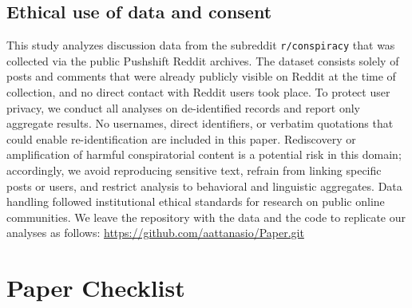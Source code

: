 \documentclass[letterpaper]{article} %
\begin{document}
\subsection{Ethical use of data and consent}
This study analyzes discussion data from the subreddit \texttt{r/conspiracy} that was collected via the public Pushshift Reddit archives. 
The dataset consists solely of posts and comments that were already publicly visible on Reddit at the time of collection, and no direct contact with Reddit users took place. 
To protect user privacy, we conduct all analyses on de-identified records and report only aggregate results.
No usernames, direct identifiers, or verbatim quotations that could enable re-identification are included in this paper. 
Rediscovery or amplification of harmful conspiratorial content is a potential risk in this domain; accordingly, we avoid reproducing sensitive text, refrain from linking specific posts or users, and restrict analysis to behavioral and linguistic aggregates. 
Data handling followed institutional ethical standards for research on public online communities.
We leave the repository with the data and the code to replicate our analyses as follows: \url{https://github.com/aattanasio/Paper.git}


\section*{Paper Checklist}
\end{document}
